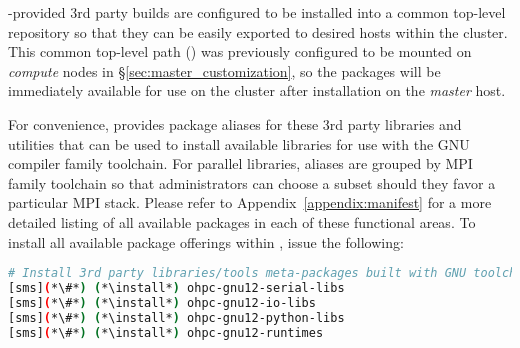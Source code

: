 \begin{center}
\begin{tcolorbox}[]
\small
\OHPC{}-provided 3rd party builds are configured to be installed
into a common top-level repository so that they can be easily exported to
desired hosts within the cluster. This common top-level path
() was previously configured to be mounted on {\em
 compute} nodes in \S\ref{sec:master_customization}, so the packages will be
immediately available for use on the cluster after installation on the {\em
 master} host.
\end{tcolorbox}
\end{center}


For convenience, \OHPC{} provides package aliases for these 3rd party libraries
and utilities that can be used to install available libraries for use with the
GNU compiler family toolchain. For parallel libraries, aliases are grouped by
MPI family toolchain so that administrators can choose a subset should they
favor a particular MPI stack.  Please refer to Appendix~\ref{appendix:manifest}
for a more detailed listing of all available packages in each of these functional
areas. To install all available package offerings within \OHPC{}, issue the
following:

\begin{lstlisting}[language=bash,keywords={},upquote=true,keepspaces]
# Install 3rd party libraries/tools meta-packages built with GNU toolchain
[sms](*\#*) (*\install*) ohpc-gnu12-serial-libs
[sms](*\#*) (*\install*) ohpc-gnu12-io-libs
[sms](*\#*) (*\install*) ohpc-gnu12-python-libs
[sms](*\#*) (*\install*) ohpc-gnu12-runtimes
\end{lstlisting}



